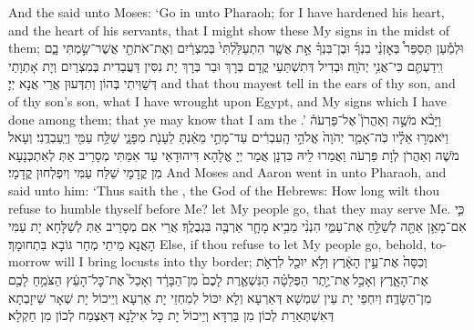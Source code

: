 {And the \lord\space said unto Moses: ‘Go in unto Pharaoh; for I have hardened his heart, and the heart of his servants, that I might show these My signs in the midst of them;}{}
{וּלְמַ֡עַן תְּסַפֵּר֩ בְּאׇזְנֵ֨י בִנְךָ֜ וּבֶן־בִּנְךָ֗ אֵ֣ת אֲשֶׁ֤ר הִתְעַלַּ֙לְתִּי֙ בְּמִצְרַ֔יִם וְאֶת־אֹתֹתַ֖י אֲשֶׁר־שַׂ֣מְתִּי בָ֑ם וִֽידַעְתֶּ֖ם כִּי־אֲנִ֥י יְהֹוָֽה׃
}
{וּבְדִיל דְּתִשְׁתַּעֵי קֳדָם בְּרָךְ וּבַר בְּרָךְ יָת נִסִּין דַּעֲבַדִית בְּמִצְרַיִם וְיָת אָתְוָתַי דְּשַׁוִּיתִי בְּהוֹן וְתִדְּעוּן אֲרֵי אֲנָא יְיָ׃}
{and that thou mayest tell in the ears of thy son, and of thy son’s son, what I have wrought upon Egypt, and My signs which I have done among them; that ye may know that I am the \lord.’}{}
{וַיָּבֹ֨א מֹשֶׁ֣ה וְאַהֲרֹן֮ אֶל־פַּרְעֹה֒ וַיֹּאמְר֣וּ אֵלָ֗יו כֹּֽה־אָמַ֤ר יְהֹוָה֙ אֱלֹהֵ֣י הָֽעִבְרִ֔ים עַד־מָתַ֣י מֵאַ֔נְתָּ לֵעָנֹ֖ת מִפָּנָ֑י שַׁלַּ֥ח עַמִּ֖י וְיַֽעַבְדֻֽנִי׃
}
{וְעָאל מֹשֶׁה וְאַהֲרֹן לְוָת פַּרְעֹה וַאֲמַרוּ לֵיהּ כִּדְנָן אֲמַר יְיָ אֱלָהָא דִּיהוּדָאֵי עַד אִמַּתִּי מְסָרֵיב אַתְּ לְאִתְכְּנָעָא מִן קֳדָמָי שַׁלַּח עַמִּי וְיִפְלְחוּן קֳדָמָי׃}
{And Moses and Aaron went in unto Pharaoh, and said unto him: ‘Thus saith the \lord, the God of the Hebrews: How long wilt thou refuse to humble thyself before Me? let My people go, that they may serve Me.}{}
{כִּ֛י אִם־מָאֵ֥ן אַתָּ֖ה לְשַׁלֵּ֣חַ אֶת־עַמִּ֑י הִנְנִ֨י מֵבִ֥יא מָחָ֛ר אַרְבֶּ֖ה בִּגְבֻלֶֽךָ׃}
{אֲרֵי אִם מְסָרֵיב אַתְּ לְשַׁלָּחָא יָת עַמִּי הָאֲנָא מֵיתֵי מְחַר גּוֹבָא בִּתְחוּמָךְ׃}
{Else, if thou refuse to let My people go, behold, to-morrow will I bring locusts into thy border;}{}
{וְכִסָּה֙ אֶת־עֵ֣ין הָאָ֔רֶץ וְלֹ֥א יוּכַ֖ל לִרְאֹ֣ת אֶת־הָאָ֑רֶץ וְאָכַ֣ל \legarmeh  אֶת־יֶ֣תֶר הַפְּלֵטָ֗ה הַנִּשְׁאֶ֤רֶת לָכֶם֙ מִן־הַבָּרָ֔ד וְאָכַל֙ אֶת־כׇּל־הָעֵ֔ץ הַצֹּמֵ֥חַ לָכֶ֖ם מִן־הַשָּׂדֶֽה׃
}
{וְיִחְפֵי יָת עֵין שִׁמְשָׁא דְּאַרְעָא וְלָא יִכּוֹל לְמִחְזֵי יָת אַרְעָא וְיֵיכוֹל יָת שְׁאָר שֵׁיזָבְתָא דְּאִשְׁתְּאַרַת לְכוֹן מִן בַּרְדָּא וְיֵיכוֹל יָת כָּל אִילָנָא דְּאַצְמַח לְכוֹן מִן חַקְלָא׃}
